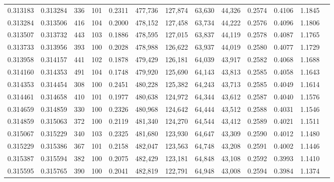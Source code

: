 \begin{tabular}{rrrrrrrrrrrrr}
0.313183 & 0.313284 &   336 & 101 &                                     0.2311 & 477,736 & 127,874 &  63,630 &  44,326 & 0.2574 & 0.4106 & 1.1845 \\
0.313284 & 0.313506 &   416 & 104 &                                     0.2000 & 478,152 & 127,458 &  63,734 &  44,222 & 0.2576 & 0.4096 & 1.1806 \\
0.313507 & 0.313732 &   443 & 103 &                                     0.1886 & 478,595 & 127,015 &  63,837 &  44,119 & 0.2578 & 0.4087 & 1.1765 \\
0.313733 & 0.313956 &   393 & 100 &                                     0.2028 & 478,988 & 126,622 &  63,937 &  44,019 & 0.2580 & 0.4077 & 1.1729 \\
0.313958 & 0.314157 &   441 & 102 &                                     0.1878 & 479,429 & 126,181 &  64,039 &  43,917 & 0.2582 & 0.4068 & 1.1688 \\
0.314160 & 0.314353 &   491 & 104 &                                     0.1748 & 479,920 & 125,690 &  64,143 &  43,813 & 0.2585 & 0.4058 & 1.1643 \\
0.314353 & 0.314454 &   308 & 100 &                                     0.2451 & 480,228 & 125,382 &  64,243 &  43,713 & 0.2585 & 0.4049 & 1.1614 \\
0.314461 & 0.314658 &   410 & 101 &                                     0.1977 & 480,638 & 124,972 &  64,344 &  43,612 & 0.2587 & 0.4040 & 1.1576 \\
0.314659 & 0.314859 &   330 & 100 &                                     0.2326 & 480,968 & 124,642 &  64,444 &  43,512 & 0.2588 & 0.4031 & 1.1546 \\
0.314859 & 0.315063 &   372 & 100 &                                     0.2119 & 481,340 & 124,270 &  64,544 &  43,412 & 0.2589 & 0.4021 & 1.1511 \\
0.315067 & 0.315229 &   340 & 103 &                                     0.2325 & 481,680 & 123,930 &  64,647 &  43,309 & 0.2590 & 0.4012 & 1.1480 \\
0.315229 & 0.315386 &   367 & 101 &                                     0.2158 & 482,047 & 123,563 &  64,748 &  43,208 & 0.2591 & 0.4002 & 1.1446 \\
0.315387 & 0.315594 &   382 & 100 &                                     0.2075 & 482,429 & 123,181 &  64,848 &  43,108 & 0.2592 & 0.3993 & 1.1410 \\
0.315595 & 0.315765 &   390 & 100 &                                     0.2041 & 482,819 & 122,791 &  64,948 &  43,008 & 0.2594 & 0.3984 & 1.1374 \\

\end{tabular}

